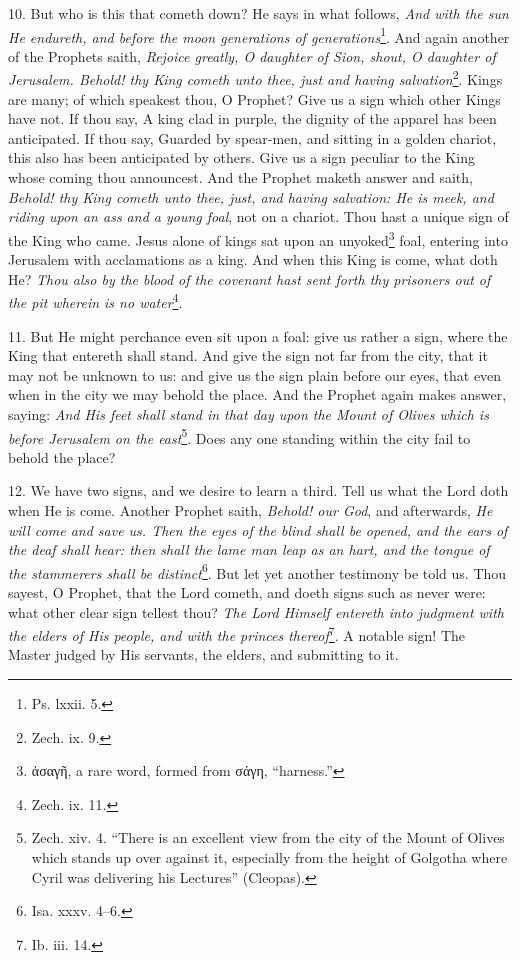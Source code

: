 10. But who is this that cometh down? He says in what follows, \emph{And with the sun He endureth, and before the moon generations of generations}\footnote{Ps. lxxii. 5.}. And again another of the Prophets saith, \emph{Rejoice greatly, O daughter of Sion, shout, O daughter of Jerusalem. Behold! thy King cometh unto thee, just and having salvation}\footnote{Zech. ix. 9.}. Kings are many; of which speakest thou, O Prophet? Give us a sign which other Kings have not. If thou say, A king clad in purple, the dignity of the apparel has been anticipated. If thou say, Guarded by spear-men, and sitting in a golden chariot, this also has been anticipated by others. Give us a sign peculiar to the King whose coming thou announcest. And the Prophet maketh answer and saith, \emph{Behold! thy King cometh unto thee, just, and having salvation: He is meek, and riding upon an ass and a young foal}, not on a chariot. Thou hast a unique sign of the King who came. Jesus alone of kings sat upon an unyoked\footnote{\textgreek{ἀσαγῆ}, a rare word, formed from \textgreek{σάγη}, “harness.”} foal, entering into Jerusalem with acclamations as a king. And when this King is come, what doth He? \emph{Thou also by the blood of the covenant hast sent forth thy prisoners out of the pit wherein is no water}\footnote{Zech. ix. 11.}.

11. But He might perchance even sit upon a foal: give us rather a sign, where the King that entereth shall stand. And give the sign not far from the city, that it may not be unknown to us: and give us the sign plain before our eyes, that even when in the city we may behold the place. And the Prophet again makes answer, saying: \emph{And His feet shall stand in that day upon the Mount of Olives which is before Jerusalem on the east}\footnote{Zech. xiv. 4. “There is an excellent view from the city of the Mount of Olives which stands up over against it, especially from the height of Golgotha where Cyril was delivering his Lectures” (Cleopas).}. Does any one standing within the city fail to behold the place?

12. We have two signs, and we desire to learn a third. Tell us what the Lord doth when He is come. Another Prophet saith, \emph{Behold! our God}, and afterwards, \emph{He will come and save us. Then the eyes of the blind shall be opened, and the ears of the deaf shall hear: then shall the lame man leap as an hart, and the tongue of the stammerers shall be distinct}\footnote{Isa. xxxv. 4–6.}. But let yet another testimony be told us. Thou sayest, O Prophet, that the Lord cometh, and doeth signs such as never were: what other clear sign tellest thou? \emph{The Lord Himself entereth into judgment with the elders of His people, and with the princes thereof}\footnote{Ib. iii. 14.}. A notable sign! The Master judged by His servants, the elders, and submitting to it.

